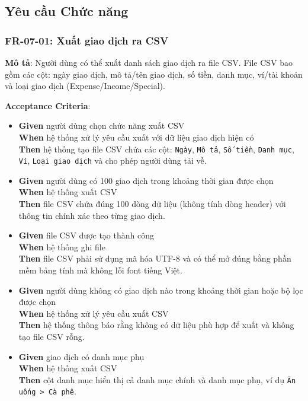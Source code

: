 \subsection{Yêu cầu Chức năng}



\subsubsection{FR-07-01: Xuất giao dịch ra CSV}

\textbf{Mô tả}: Người dùng có thể xuất danh sách giao dịch ra file CSV. File CSV bao gồm các cột: ngày giao dịch, mô tả/tên giao dịch, số tiền, danh mục, ví/tài khoản và loại giao dịch (Expense/Income/Special).



\textbf{Acceptance Criteria}:

\begin{itemize}
\item \textbf{Given} người dùng chọn chức năng xuất CSV  \\ \hspace*{1.5em}  \textbf{When} hệ thống xử lý yêu cầu xuất với dữ liệu giao dịch hiện có  \\ \hspace*{1.5em}  \textbf{Then} hệ thống tạo file CSV chứa các cột: \texttt{Ngày}, \texttt{Mô tả}, \texttt{Số tiền}, \texttt{Danh mục}, \texttt{Ví}, \texttt{Loại giao dịch} và cho phép người dùng tải về.
\item \textbf{Given} người dùng có 100 giao dịch trong khoảng thời gian được chọn  \\ \hspace*{1.5em}  \textbf{When} hệ thống xuất CSV  \\ \hspace*{1.5em}  \textbf{Then} file CSV chứa đúng 100 dòng dữ liệu (không tính dòng header) với thông tin chính xác theo từng giao dịch.
\item \textbf{Given} file CSV được tạo thành công  \\ \hspace*{1.5em}  \textbf{When} hệ thống ghi file  \\ \hspace*{1.5em}  \textbf{Then} file CSV phải sử dụng mã hóa UTF-8 và có thể mở đúng bằng phần mềm bảng tính mà không lỗi font tiếng Việt.
\item \textbf{Given} người dùng không có giao dịch nào trong khoảng thời gian hoặc bộ lọc được chọn  \\ \hspace*{1.5em}  \textbf{When} hệ thống xử lý yêu cầu xuất CSV  \\ \hspace*{1.5em}  \textbf{Then} hệ thống thông báo rằng không có dữ liệu phù hợp để xuất và không tạo file CSV rỗng.
\item \textbf{Given} giao dịch có danh mục phụ  \\ \hspace*{1.5em}  \textbf{When} hệ thống xuất CSV  \\ \hspace*{1.5em}  \textbf{Then} cột danh mục hiển thị cả danh mục chính và danh mục phụ, ví dụ \texttt{Ăn uống > Cà phê}.
\end{itemize}
